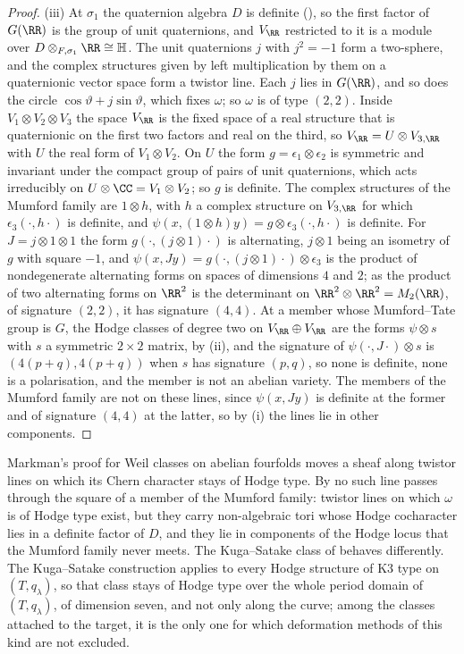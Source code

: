 \begin{proof}
(iii) At $\sigma_{1}$ the quaternion algebra $D$ is definite
(), so the first factor of $G(\RR)$ is the group of unit
quaternions, and $V_{\RR}$ restricted to it is a module over
$D\otimes_{F,\sigma_{1}}\RR\cong\mathbb{H}$. The unit quaternions $j$ with
$j^{2}=-1$ form a two-sphere, and the complex structures given by left
multiplication by them on a quaternionic vector space form a twistor line.
Each $j$ lies in $G(\RR)$, and so does the circle $\cos\vartheta+j\sin\vartheta$,
which fixes $\omega$; so $\omega$ is of type $(2,2)$. Inside
$V_{1}\otimes V_{2}\otimes V_{3}$ the space $V_{\RR}$ is the fixed space of a
real structure that is quaternionic on the first two factors and real on the
third, so $V_{\RR}=U\otimes V_{3,\RR}$ with $U$ the real form of
$V_{1}\otimes V_{2}$. On $U$ the form $g=\epsilon_{1}\otimes\epsilon_{2}$ is
symmetric and invariant under the compact group of pairs of unit quaternions,
which acts irreducibly on $U\otimes\CC=V_{1}\otimes V_{2}$; so $g$ is
definite. The complex structures of the Mumford family are $1\otimes h$, with
$h$ a complex structure on $V_{3,\RR}$ for which $\epsilon_{3}(\cdot,h\cdot)$
is definite, and $\psi(x,(1\otimes h)y)=g\otimes\epsilon_{3}(\cdot,h\cdot)$ is
definite. For $J=j\otimes1\otimes1$ the form $g(\cdot,(j\otimes1)\cdot)$ is
alternating, $j\otimes1$ being an isometry of $g$ with square $-1$, and
$\psi(x,Jy)=g(\cdot,(j\otimes1)\cdot)\otimes\epsilon_{3}$ is the product of
nondegenerate alternating forms on spaces of dimensions $4$ and $2$; as the
product of two alternating forms on $\RR^{2}$ is the determinant on
$\RR^{2}\otimes\RR^{2}=M_{2}(\RR)$, of signature $(2,2)$, it has signature
$(4,4)$. At a member whose Mumford--Tate group is $G$, the Hodge
classes of degree two on $V_{\RR}\oplus V_{\RR}$ are the forms $\psi\otimes s$
with $s$ a symmetric $2\times2$ matrix, by (ii), and
the signature of $\psi(\cdot,J\cdot)\otimes s$ is $(4(p+q),4(p+q))$ when $s$ has
signature $(p,q)$, so none is definite, none is a polarisation, and the member
is not an abelian variety. The members of the Mumford family are not on these
lines, since $\psi(x,Jy)$ is definite at the former and of signature $(4,4)$
at the latter, so by (i) the lines lie in other components.
\end{proof}

Markman's proof for Weil classes on abelian fourfolds moves a sheaf along
twistor lines on which its Chern character stays of Hodge type. By
 no such line passes through the square of a member of
the Mumford family: twistor lines on which $\omega$ is of Hodge type exist,
but they carry non-algebraic tori whose Hodge cocharacter lies in a definite
factor of $D$, and they lie in components of the Hodge locus that the Mumford
family never meets. The Kuga--Satake class of  behaves
differently. The Kuga--Satake construction applies to every Hodge structure
of K3 type on $(T,q_{\lambda})$, so that class stays of Hodge type over the
whole period domain of $(T,q_{\lambda})$, of dimension seven, and not only
along the curve; among the classes attached to the target, it is the only one
for which deformation methods of this kind are not excluded.

